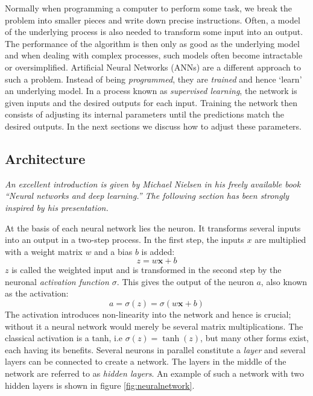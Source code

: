 \documentclass{Dissertate}
\begin{document}
Normally when programming a computer to perform some task, we break the
problem into smaller pieces and write down precise instructions.
Often, a model of the underlying process is also needed to transform
some input into an output. The performance of the algorithm is then only
as good as the underlying model and when dealing with complex processes,
such models often become intractable or oversimplified. Artificial
Neural Networks (ANNs) are a different approach to such a problem.
Instead of being \emph{programmed}, they are \emph{trained} and hence
`learn' an underlying model. In a process known as \emph{supervised
learning}, the network is given inputs and the desired outputs for each
input. Training the network then consists of adjusting its internal
parameters until the predictions match the desired outputs. In the next
sections we discuss how to adjust these parameters.

\hypertarget{architecture}{%
\subsection{Architecture}\label{architecture}}

\emph{An excellent introduction is given by Michael Nielsen in his
freely available book ``Neural networks and deep learning.'' The
following section has been strongly inspired by his presentation.}

At the basis of each neural network lies the neuron. It transforms
several inputs into an output in a two-step process. In the first step,
the inputs \(x\) are multiplied with a weight matrix \(w\) and a bias
\(b\) is added: \[
z = w\mathbf{x}+b
\] \(z\) is called the weighted input and is transformed in the second
step by the neuronal \emph{activation function \(\sigma\)}. This gives
the output of the neuron \(a\), also known as the activation:
\begin{equation}
a = \sigma(z) = \sigma(w\mathbf{x}+b)
\label{eq:activation}\end{equation} The activation introduces
non-linearity into the network and hence is crucial; without it a neural
network would merely be several matrix multiplications. The classical
activation is a tanh, i.e \(\sigma(z)=\tanh(z)\), but many other forms
exist, each having its benefits. Several neurons in parallel constitute
a \emph{layer} and several layers can be connected to create a network.
The layers in the middle of the network are referred to as \emph{hidden
layers}. An example of such a network with two hidden layers is shown in
figure \ref{fig:neuralnetwork}.
\end{document}
